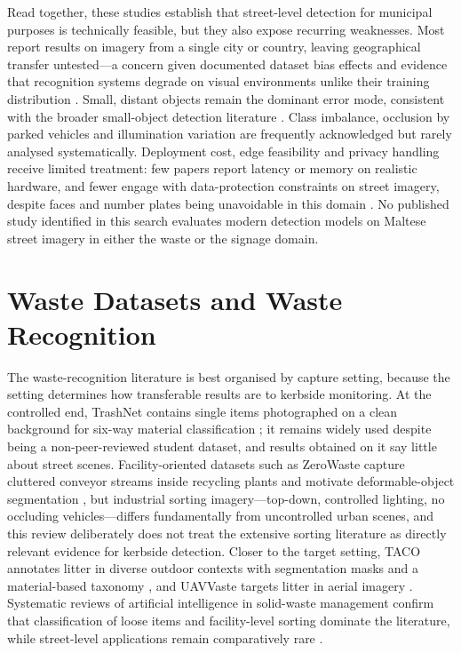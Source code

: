 Read together, these studies establish that street-level detection for municipal purposes is technically feasible, but they also expose recurring weaknesses. Most report results on imagery from a single city or country, leaving geographical transfer untested---a concern given documented dataset bias effects \citep{torralba2011unbiased} and evidence that recognition systems degrade on visual environments unlike their training distribution \citep{devries2019does}. Small, distant objects remain the dominant error mode, consistent with the broader small-object detection literature \citep{cheng2023towards}. Class imbalance, occlusion by parked vehicles and illumination variation are frequently acknowledged but rarely analysed systematically. Deployment cost, edge feasibility and privacy handling receive limited treatment: few papers report latency or memory on realistic hardware, and fewer engage with data-protection constraints on street imagery, despite faces and number plates being unavoidable in this domain \citep{gdpr2016}. No published study identified in this search evaluates modern detection models on Maltese street imagery in either the waste or the signage domain.

\section{Waste Datasets and Waste Recognition}
\label{sec:lr-waste}

The waste-recognition literature is best organised by capture setting, because the setting determines how transferable results are to kerbside monitoring. At the controlled end, TrashNet contains single items photographed on a clean background for six-way material classification \citep{yang2016trashnet}; it remains widely used despite being a non-peer-reviewed student dataset, and results obtained on it say little about street scenes. Facility-oriented datasets such as ZeroWaste capture cluttered conveyor streams inside recycling plants and motivate deformable-object segmentation \citep{bashkirova2022zerowaste}, but industrial sorting imagery---top-down, controlled lighting, no occluding vehicles---differs fundamentally from uncontrolled urban scenes, and this review deliberately does not treat the extensive sorting literature \citep[surveyed by][]{lu2022computer} as directly relevant evidence for kerbside detection. Closer to the target setting, TACO annotates litter in diverse outdoor contexts with segmentation masks and a material-based taxonomy \citep{proenca2020taco}, and UAVVaste targets litter in aerial imagery \citep{kraft2021uavvaste}. Systematic reviews of artificial intelligence in solid-waste management confirm that classification of loose items and facility-level sorting dominate the literature, while street-level applications remain comparatively rare \citep{abdallah2020artificial}.

